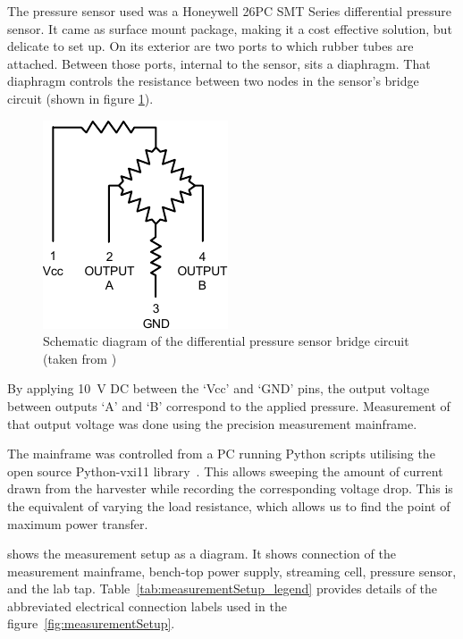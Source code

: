     The pressure sensor used was a Honeywell 26PC SMT Series differential pressure sensor.
    It came as surface mount package, making it a cost effective solution, but delicate to set up.
    On its exterior are two ports to which rubber tubes are attached.
    Between those ports, internal to the sensor, sits a diaphragm.
    That diaphragm controls the resistance between two nodes in the sensor's bridge circuit (shown in figure \ref{fig:PressureSensorSchematic}).
    \begin{figure}
        \centering
        \includegraphics{content/pt1/01-PowerHarvesting/graphics/PressureSensorSchematic}
        \caption{\label{fig:PressureSensorSchematic}Schematic diagram of the differential pressure sensor bridge circuit (taken from \cite{Honeywell2003})}
    \end{figure}
    By applying \SI{10}{\volt} DC between the `Vcc' and `GND' pins, the output voltage between outputs `A' and `B' correspond to the applied pressure.
    Measurement of that output voltage was done using the precision measurement mainframe.

    The mainframe was controlled from a PC running Python scripts utilising the open source Python-vxi11 library~\cite{Python-ivi2014}.
    This allows sweeping the amount of current drawn from the harvester while recording the corresponding voltage drop.
    This is the equivalent of varying the load resistance, which allows us to find the point of maximum power transfer.

     shows the measurement setup as a diagram.
    It shows connection of the measurement mainframe, bench-top power supply, streaming cell, pressure sensor, and the lab tap.
    Table~\ref{tab:measurementSetup_legend} provides details of the abbreviated electrical connection labels used in the figure~\ref{fig:measurementSetup}.

